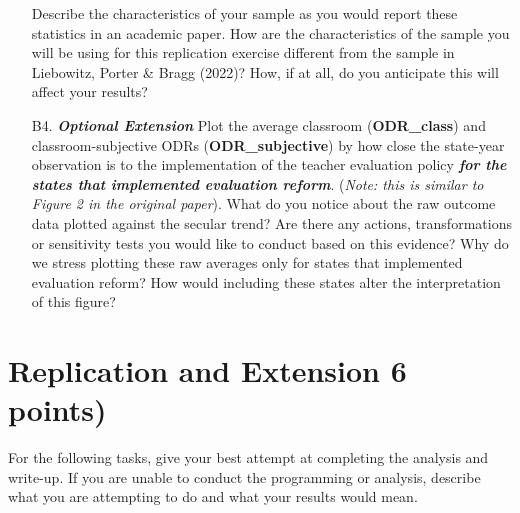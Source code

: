 \documentclass[a4paper, 11pt]{article}
\begin{document}
\begin{enumerate}
Describe the characteristics of your sample as you would report these statistics in an academic paper. How are the characteristics of the sample you will be using for this replication exercise different from the sample in Liebowitz, Porter \& Bragg (2022)? How, if at all, do you anticipate this will affect your results?
	\item[B4.] \textbf{\textit{Optional Extension}} Plot the average classroom (\textbf{ODR\_class}) and classroom-subjective ODRs (\textbf{ODR\_subjective}) by how close the state-year observation is to the implementation of the teacher evaluation policy \textbf{\textit{for the states that implemented evaluation reform}}. (\textit{Note: this is similar to Figure 2 in the original paper}). What do you notice about the raw outcome data plotted against the secular trend? Are there any actions, transformations or sensitivity tests you would like to conduct based on this evidence? Why do we stress plotting these raw averages only for states that implemented evaluation reform? How would including these states alter the interpretation of this figure?

\end{enumerate}

\section{Replication and Extension 6 points)}
For the following tasks, give your best attempt at completing the analysis and write-up. If you are unable to conduct the programming or analysis, describe what you are attempting to do and what your results would mean.
\end{document}
